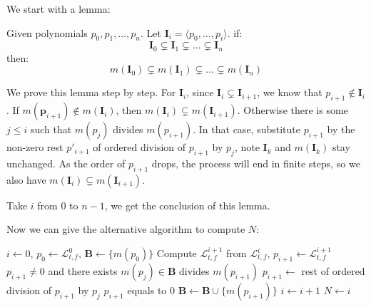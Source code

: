 \documentclass{article}
\begin{document}
We start with a lemma:

\begin{Lemma}
\label{lem:monomialChain}
Given polynomials $p_0, p_1, \dots, p_n$. Let $\boldsymbol{I}_i = \langle p_0, \dots, p_i \rangle$. if: 
	\begin{equation*}
		\boldsymbol{I}_0 \subsetneq \boldsymbol{I}_1 \subsetneq \dots \subsetneq \boldsymbol{I}_n
	\end{equation*}
then: 
	\begin{equation*}
		m(\boldsymbol{I}_0) \subsetneq m(\boldsymbol{I}_1) \subsetneq \dots \subsetneq m(\boldsymbol{I}_n)
	\end{equation*}
\end{Lemma}

\begin{Proof}
We prove this lemma step by step. For $\boldsymbol{I}_i$, since $\boldsymbol{I}_i \subsetneq \boldsymbol{I}_{i+1}$, we know that $p_{i+1} \notin \boldsymbol{I}_i$. If $m(\boldsymbol{p}_{i+1}) \notin m(\boldsymbol{I}_i)$, then $m(\boldsymbol{I}_i) \subsetneq m(\boldsymbol{I}_{i+1})$. Otherwise there is some $j \leq i$ such that $m(p_j)$ divides $m(p_{i+1})$. In that case, substitute $p_{i+1}$ by the non-zero rest $p'_{i+1}$ of ordered division of $p_{i+1}$ by $p_j$, note $\boldsymbol{I}_k$ and $m(\boldsymbol{I}_k)$ stay unchanged. As the order of $p_{i+1}$ drops, the process will end in finite steps, so we also have $m(\boldsymbol{I}_i) \subsetneq m(\boldsymbol{I}_{i+1})$.

Take $i$ from $0$ to $n-1$, we get the conclusion of this lemma.
\end{Proof}

Now we can give the alternative algorithm to compute $N$:

\begin{codebox}
\li 	$i \gets 0$, $p_0 \gets \mathcal{L}_{t, f}^0$, $\boldsymbol{B} \gets \{ m(p_0) \}$
\li 	\While {}
\li		\Do
			Compute $\mathcal{L}_{t, f}^{i+1}$ from $\mathcal{L}_{t, f}^i$, $p_{i+1} \gets \mathcal{L}_{t, f}^{i+1}$
\li			\While $p_{i+1} \neq 0$ and there exists $m(p_j) \in \boldsymbol{B}$ divides $m(p_{i+1})$
\li				\Do
					$p_{i+1} \gets$ rest of ordered division of $p_{i+1}$ by $p_j$
				\End
\li			\If $p_{i+1}$ equals to $0$
\li				\Then
				\End
\li			$\boldsymbol{B} \gets \boldsymbol{B} \cup \{ m(p_{i+1}) \}$
\li			$i \gets i+1$
		\End
\li	$N \gets i$
\end{codebox}
\end{document}
